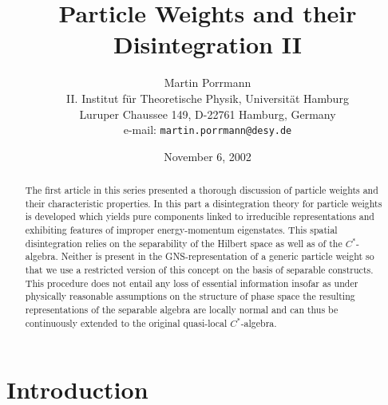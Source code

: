 \documentclass[a4paper,a4paper]{article}
\numberwithin{equation}{section}
\theoremstyle{definition}
\theoremstyle{plain}
\theoremstyle{remark}
\theoremstyle{assumption}
\begin{document}
%
\title{Particle Weights and their Disintegration II}
\author{Martin Porrmann\\
  II. Institut f\"ur Theoretische Physik, Universit\"at Hamburg\\
  Luruper Chaussee 149, D-22761 Hamburg, Germany\\
  e-mail: \texttt{martin.porrmann@desy.de}}
\date{November 6, 2002}

\maketitle

%
\begin{abstract}
  The first article in this series presented a thorough discussion of
  particle weights and their characteristic properties. In this part a
  disintegration theory for particle weights is developed which yields
  pure components linked to irreducible representations and exhibiting
  features of improper energy-momentum eigenstates. This spatial
  disintegration relies on the separability of the Hilbert space as
  well as of the $C^*$-algebra. Neither is present in the
  GNS-representation of a generic particle weight so that we use a
  restricted version of this concept on the basis of separable
  constructs. This procedure does not entail any loss of essential
  information insofar as under physically reasonable assumptions on
  the structure of phase space the resulting representations of the
  separable algebra are locally normal and can thus be continuously
  extended to the original quasi-local $C^*$-algebra.
\end{abstract}
%


\section{Introduction}
  \label{sec:introduction}
  
\end{document}
